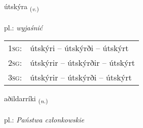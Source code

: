 \documentclass[frontgrid, backgrid]{flacards}\usepackage[]{graphicx}\usepackage[]{xcolor}
\begin{document}
\renewcommand{\flhead}{\vskip5pt \fboxsep=0pt {\small\bfseries\footnotesize Sagnorð | Verb}}
\renewcommand{\fcfoot}{\vskip5pt \fboxsep=0pt \hspace{2pt}{\small\bfseries\footnotesize 2K}}

\renewcommand{\blhead}{\vskip5pt {\small\bfseries\footnotesize Sagnorð | Verb }}
\renewcommand{\bcfoot}{\vskip5pt \hspace{2pt}{\small\bfseries\footnotesize 2K}}


{útskýra \small{\textsubscript{(\textit{v.})}} \\[1ex] %
\textphonetic{[uːtscira]} \\
pl.: \emph{wyjaśnić} \\  [2ex]
\renewcommand*{\arraystretch}{0.8}
\begin{tabular}{p{1cm}l}
\textsc{1sg}: & útskýri -- útskýrði -- útskýrt \\ 
\textsc{2sg}: & útskýrir -- útskýrðir -- útskýrt \\ 
\textsc{3sg}: & útskýrir -- útskýrði -- útskýrt \\ 
\end{tabular}
}

\renewcommand{\flhead}{\vskip5pt \fboxsep=0pt {\small\bfseries\footnotesize Nafnorð | Noun}}
\renewcommand{\fcfoot}{\vskip5pt \fboxsep=0pt \hspace{2pt}{\small\bfseries\footnotesize 2K}}

\renewcommand{\blhead}{\vskip5pt {\small\bfseries\footnotesize Nafnorð | Noun }}
\renewcommand{\bcfoot}{\vskip5pt \hspace{2pt}{\small\bfseries\footnotesize 2K}}


{aðildarríki \small{\textsubscript{(\textit{n.})}} \\[1ex] %
\textphonetic{[aːðɪltaricɪ]} \\
pl.: \emph{Państwa członkowskie} \\  [2ex]
\renewcommand*{\arraystretch}{0.8}
}
\end{document}
